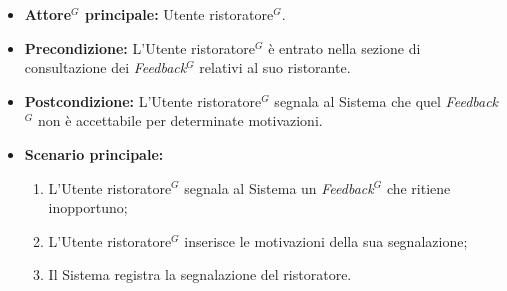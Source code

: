 \label{usecase:Segnalazione di un \gls{Feedback}$^G$}
\begin{itemize}
	\item \textbf{\gls{Attore}$^G$ principale:} \gls{Utente ristoratore}$^G$.

	\item \textbf{Precondizione:} L'\gls{Utente ristoratore}$^G$ è entrato nella sezione di consultazione dei \textit{\gls{Feedback}$^G$} relativi al suo ristorante.

	\item \textbf{Postcondizione:} L'\gls{Utente ristoratore}$^G$ segnala al Sistema che quel \textit{\gls{Feedback}$^G$} non è accettabile per determinate motivazioni.


	\item \textbf{Scenario principale:}
	      \begin{enumerate}
		      \item L'\gls{Utente ristoratore}$^G$ segnala al Sistema un \textit{\gls{Feedback}$^G$} che ritiene inopportuno;
		      \item L'\gls{Utente ristoratore}$^G$ inserisce le motivazioni della sua segnalazione;
		      \item Il Sistema registra la segnalazione del ristoratore.

	      \end{enumerate}
\end{itemize}
